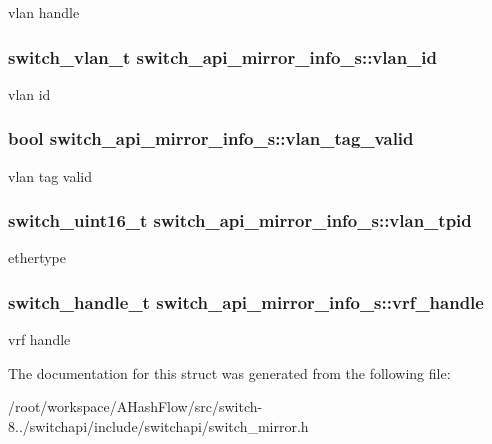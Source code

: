 vlan handle \hypertarget{structswitch__api__mirror__info__s_ab0edc988263aeafd90f558f8701d5cf1}{
\subsubsection[{vlan\+\_\+id}]{\setlength{\rightskip}{0pt plus 5cm}switch\+\_\+vlan\+\_\+t switch\+\_\+api\+\_\+mirror\+\_\+info\+\_\+s\+::vlan\+\_\+id}}\label{structswitch__api__mirror__info__s_ab0edc988263aeafd90f558f8701d5cf1}
vlan id \hypertarget{structswitch__api__mirror__info__s_a94f7176a1219b8ae7444aefc40d31dd9}{
\subsubsection[{vlan\+\_\+tag\+\_\+valid}]{\setlength{\rightskip}{0pt plus 5cm}bool switch\+\_\+api\+\_\+mirror\+\_\+info\+\_\+s\+::vlan\+\_\+tag\+\_\+valid}}\label{structswitch__api__mirror__info__s_a94f7176a1219b8ae7444aefc40d31dd9}
vlan tag valid \hypertarget{structswitch__api__mirror__info__s_a3fc15780339e394d76ffb7ea8f2f5649}{
\subsubsection[{vlan\+\_\+tpid}]{\setlength{\rightskip}{0pt plus 5cm}switch\+\_\+uint16\+\_\+t switch\+\_\+api\+\_\+mirror\+\_\+info\+\_\+s\+::vlan\+\_\+tpid}}\label{structswitch__api__mirror__info__s_a3fc15780339e394d76ffb7ea8f2f5649}
ethertype \hypertarget{structswitch__api__mirror__info__s_ac9ab8271227d7a182942c0c1242332ac}{
\subsubsection[{vrf\+\_\+handle}]{\setlength{\rightskip}{0pt plus 5cm}switch\+\_\+handle\+\_\+t switch\+\_\+api\+\_\+mirror\+\_\+info\+\_\+s\+::vrf\+\_\+handle}}\label{structswitch__api__mirror__info__s_ac9ab8271227d7a182942c0c1242332ac}
vrf handle 

The documentation for this struct was generated from the following file\+:\begin{DoxyCompactItemize}
\item 
/root/workspace/\+A\+Hash\+Flow/src/switch-\/8../switchapi/include/switchapi/switch\+\_\+mirror.\+h\end{DoxyCompactItemize}
